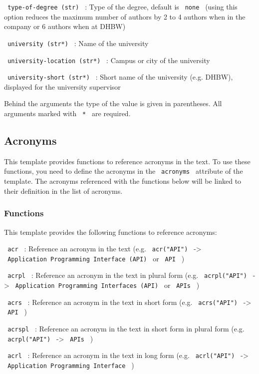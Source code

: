 \texttt{\ type-of-degree\ (str)\ } : Type of the degree, default is
\texttt{\ none\ } (using this option reduces the maximum number of
authors by 2 to 4 authors when in the company or 6 authors when at DHBW)

\texttt{\ university\ (str*)\ } : Name of the university

\texttt{\ university-location\ (str*)\ } : Campus or city of the
university

\texttt{\ university-short\ (str*)\ } : Short name of the university
(e.g. DHBW), displayed for the university supervisor

Behind the arguments the type of the value is given in parentheses. All
arguments marked with \texttt{\ *\ } are required.

\subsection{Acronyms}\label{acronyms}

This template provides functions to reference acronyms in the text. To
use these functions, you need to define the acronyms in the
\texttt{\ acronyms\ } attribute of the template. The acronyms referenced
with the functions below will be linked to their definition in the list
of acronyms.

\subsubsection{Functions}\label{functions}

This template provides the following functions to reference acronyms:

\texttt{\ acr\ } : Reference an acronym in the text (e.g.
\texttt{\ acr("API")\ } -\textgreater{}
\texttt{\ Application\ Programming\ Interface\ (API)\ } or
\texttt{\ API\ } )

\texttt{\ acrpl\ } : Reference an acronym in the text in plural form
(e.g. \texttt{\ acrpl("API")\ } -\textgreater{}
\texttt{\ Application\ Programming\ Interfaces\ (API)\ } or
\texttt{\ APIs\ } )

\texttt{\ acrs\ } : Reference an acronym in the text in short form (e.g.
\texttt{\ acrs("API")\ } -\textgreater{} \texttt{\ API\ } )

\texttt{\ acrspl\ } : Reference an acronym in the text in short form in
plural form (e.g. \texttt{\ acrpl("API")\ } -\textgreater{}
\texttt{\ APIs\ } )

\texttt{\ acrl\ } : Reference an acronym in the text in long form (e.g.
\texttt{\ acrl("API")\ } -\textgreater{}
\texttt{\ Application\ Programming\ Interface\ } )

